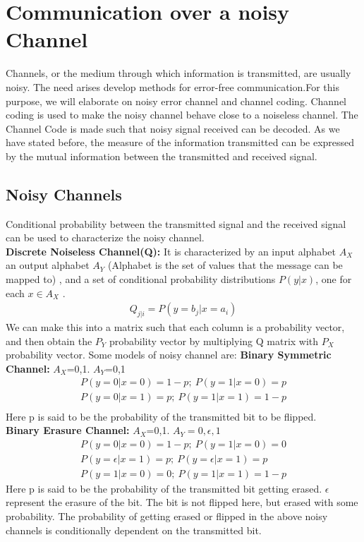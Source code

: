 \documentclass[10pt,twocolumn,letterpaper]{article}
\begin{document}
\section{Communication over a noisy Channel}
Channels, or the medium through which information is transmitted, are usually noisy. The need arises develop methods for error-free communication.For this purpose, we will elaborate on noisy error channel and channel coding. Channel coding is used to make the noisy channel behave close to a noiseless channel. The Channel Code is made such that noisy signal received can be decoded. As we have stated before, the measure of the information  transmitted can be expressed by the mutual information between the transmitted and received signal.

\subsection{Noisy Channels}

Conditional probability between the transmitted signal and the received signal can be used to characterize the noisy channel.\\
\textbf{Discrete Noiseless Channel(Q):}
It is characterized by an input alphabet $A_X$ an output alphabet $A_Y$ (Alphabet is the set of values that the message can be mapped to) , and a set of conditional probability distributions $P(y |x)$, one for each $x\in A_X$ .
\begin{eqnarray*}
    Q_{j|i}=P(y=b_j|x=a_i)
\end{eqnarray*}
We can make this into a matrix such that each column is a probability vector, and then obtain the $P_Y$ probability vector by multiplying Q matrix with $P_X$ probability vector.
Some models of noisy channel are:
\textbf{Binary Symmetric Channel:} $A_X$={0,1}. $A_Y$={0,1}
\begin{eqnarray*}
P(y=0|x=0)=1-p;\ P(y=1|x=0)=p\\
P(y= 0|x= 1)=p;\ P(y= 1|x=1) = 1-p\\
\end{eqnarray*}
Here p is said to be the probability of the transmitted bit to be flipped.\\
\textbf{Binary Erasure Channel:} $A_X$={0,1}. $A_Y={0,\epsilon,1}$
\begin{eqnarray*}
P(y=0|x=0)=1-p;\ P(y=1|x=0)=0\\
P(y= \epsilon|x= 1)=p;\ P(y= \epsilon|x=1)= p\\
P(y=1|x=0)=0;\ P(y=1|x=1)=1-p
\end{eqnarray*}
Here p is said to be the probability of the transmitted bit getting erased. $\epsilon$ represent the erasure of the bit. The bit is not flipped here, but erased with some probability.
The probability of getting erased or flipped in the above noisy channels is conditionally dependent on the transmitted bit.
\end{document}

